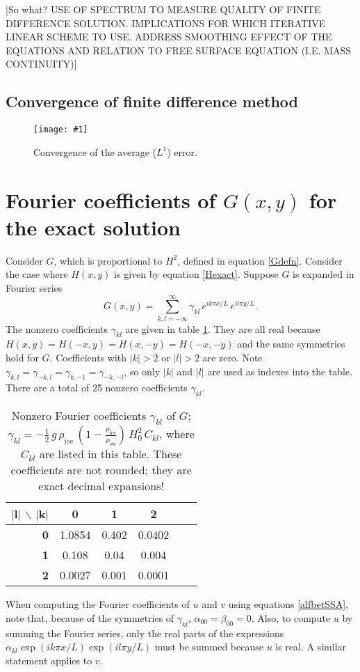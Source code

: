 \documentclass[12pt]{amsart}%
\theoremstyle{plain}
\theoremstyle{definition}
\newcommand{\regfigure}[2]{\texttt{[image: \#1]}}
\newcommand{\rhoi}{\ensuremath{\rho_{\text{ice}}}}
\newcommand{\rhosw}{\ensuremath{\rho_{\text{sw}}}}
\begin{document}
[So what?  USE OF SPECTRUM TO MEASURE QUALITY OF FINITE DIFFERENCE SOLUTION.  IMPLICATIONS FOR WHICH ITERATIVE LINEAR SCHEME TO USE.  ADDRESS SMOOTHING EFFECT OF THE EQUATIONS AND RELATION TO FREE SURFACE EQUATION (I.E. MASS CONTINUITY)]

\subsection{Convergence of finite difference method}


\begin{figure}[ht]
\regfigure{testJPISMaverr}{3.0}
\caption{Convergence of the average ($L^1$) error.}
\label{fig:averr}
\end{figure}



\small



\appendix
\section{Fourier coefficients of $G(x,y)$ for the exact solution} Consider $G$, which is proportional to $H^2$, defined in equation \eqref{Gdefn}.  Consider the case where $H(x,y)$ is given by equation \eqref{Hexact}.  Suppose $G$ is expanded in Fourier series
\begin{equation*}
G(x,y) = \sum_{k,l = -\infty}^\infty \gamma_{kl}\, e^{i k \pi x/L}\,e^{i l \pi y/L}.
\end{equation*}
The nonzero coefficients $\gamma_{kl}$ are given in table \ref{tab:coeffs}.  They are all real because $H(x,y) = H(-x,y) = H(x,-y) = H(-x,-y)$ and the same symmetries hold for $G$.  Coefficients with $|k|>2$ or $|l|>2$ are zero. Note $\gamma_{k,l} = \gamma_{-k,l} = \gamma_{k,-1} = \gamma_{-k,-l}$, so only $|k|$ and $|l|$ are used as indexes into the table.  There are a total of 25 nonzero coefficients $\gamma_{kl}$.

\begin{table}[h] \small
\caption{Nonzero Fourier coefficients $\gamma_{kl}$ of $G$; \mbox{$\gamma_{kl} = -\frac{1}{2}\,g\,\rhoi\,\left(1-\frac{\rhoi}{\rhosw}\right)\,H_0^2\, C_{kl}$}, where $C_{kl}$ are listed in this table. These coefficients are not rounded; they are exact decimal expansions!}\label{tab:coeffs}
\begin{tabular}{r|c|c|c|c|c}
$\mathbf{|l|}$ \Large $\backslash$ \normalsize $\mathbf{|k|}$ & \textbf{0} & \textbf{1} & \textbf{2} \\ \hline
\textbf{0} & 1.0854 & 0.402 & 0.0402 \\ \hline
\textbf{1} & 0.108 & 0.04 & 0.004 \\ \hline
\textbf{2} & 0.0027 & 0.001 & 0.0001
\normalsize
\end{tabular}
\end{table}

When computing the Fourier coefficients of $u$ and $v$ using equations \eqref{alfbetSSA}, note that, because of the symmetries of $\gamma_{kl}$, $\alpha_{00} = \beta_{00} = 0$.  Also, to compute $u$ by summing the Fourier series, only the real parts of the expressions $\alpha_{kl} \exp(i k \pi x/L) \exp(i l \pi y/L)$ must be summed because $u$ is real.  A similar statement applies to $v$.
\end{document}
